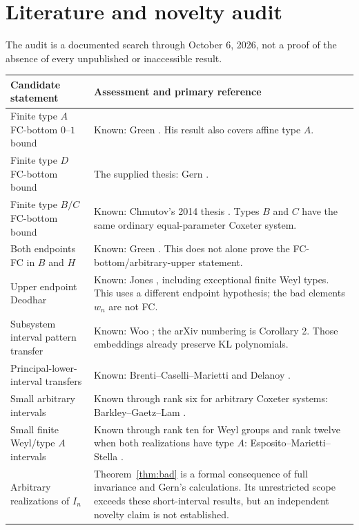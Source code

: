 \documentclass[11pt]{article}
\theoremstyle{definition}\newtheorem{definition}[theorem]{Definition}
\theoremstyle{remark}\newtheorem{remark}[theorem]{Remark}
\begin{document}
\section{Literature and novelty audit}
The audit is a documented search through October 6, 2026, not a proof
of the absence of every unpublished or inaccessible result.
\begin{center}
\small
\begin{tabular}{p{}p{}}
\toprule
Candidate statement&Assessment and primary reference\\
\midrule
Finite type $A$ FC-bottom $0$--$1$ bound&Known: Green
\cite[Theorem 4.1; arXiv Theorem 3.1]{green}. His result also covers affine type $A$.\\
Finite type $D$ FC-bottom bound&The supplied thesis:
Gern \cite[Theorem 4.5.11]{gern}.\\
Finite type $B/C$ FC-bottom bound&Known: Chmutov's 2014 thesis
\cite[Theorem 2.3.8]{chmutov}. Types $B$ and $C$ have the same
ordinary equal-parameter Coxeter system.\\
Both endpoints FC in $B$ and $H$&Known: Green
\cite[Remark 7.13]{jonestraces}. This does not alone prove the
FC-bottom/arbitrary-upper statement.\\
Upper endpoint Deodhar&Known: Jones \cite[Theorem 1.2]{jones},
including exceptional finite Weyl types. This uses a different
endpoint hypothesis; the bad elements $w_n$ are not FC.\\
Subsystem interval pattern transfer&Known: Woo
\cite[Corollary 3.3]{woo}; the arXiv numbering is Corollary 2.
Those embeddings already preserve KL polynomials.\\
Principal-lower-interval transfers&Known: Brenti--Caselli--Marietti
\cite[Theorem 7.8 and Corollary 8.4]{bcm} and Delanoy \cite{delanoy}.\\
Small arbitrary intervals&Known through rank six for arbitrary
Coxeter systems: Barkley--Gaetz--Lam \cite[Corollary 1.4]{bgl}.\\
Small finite Weyl/type $A$ intervals&Known through rank ten for Weyl
groups and rank twelve when both realizations have type $A$:
Esposito--Marietti--Stella
\cite[Corollary 1.3(ii)]{ems}.\\
Arbitrary realizations of $I_n$&Theorem~\ref{thm:bad} is a formal
consequence of full invariance and Gern's calculations.
Its unrestricted scope exceeds these short-interval results,
but an independent novelty claim is not established.\\
\bottomrule
\end{tabular}
\end{center}
\end{document}
